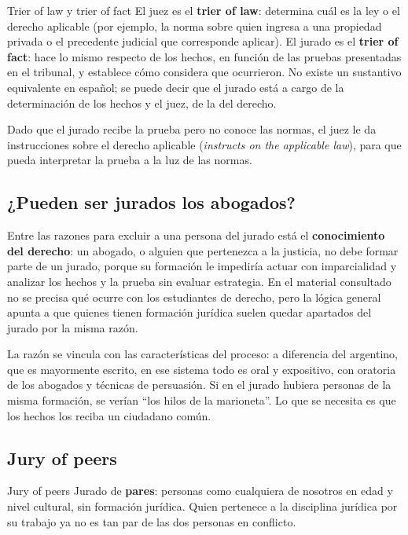 \documentclass[12pt,oneside]{book}
\begin{document}
\begin{definition}{Trier of law y trier of fact}
El juez es el \textbf{trier of law}: determina cuál es la ley o el derecho aplicable (por ejemplo, la norma sobre quien ingresa a una propiedad privada o el precedente judicial que corresponde aplicar). El jurado es el \textbf{trier of fact}: hace lo mismo respecto de los hechos, en función de las pruebas presentadas en el tribunal, y establece cómo considera que ocurrieron. No existe un sustantivo equivalente en español; se puede decir que el jurado está a cargo de la determinación de los hechos y el juez, de la del derecho.
\end{definition}

Dado que el jurado recibe la prueba pero no conoce las normas, el juez le da instrucciones sobre el derecho aplicable (\textit{instructs on the applicable law}), para que pueda interpretar la prueba a la luz de las normas.

\subsection{¿Pueden ser jurados los abogados?}

Entre las razones para excluir a una persona del jurado está el \textbf{conocimiento del derecho}: un abogado, o alguien que pertenezca a la justicia, no debe formar parte de un jurado, porque su formación le impediría actuar con imparcialidad y analizar los hechos y la prueba sin evaluar estrategia. En el material consultado no se precisa qué ocurre con los estudiantes de derecho, pero la lógica general apunta a que quienes tienen formación jurídica suelen quedar apartados del jurado por la misma razón.

La razón se vincula con las características del proceso: a diferencia del argentino, que es mayormente escrito, en ese sistema todo es oral y expositivo, con oratoria de los abogados y técnicas de persuasión. Si en el jurado hubiera personas de la misma formación, se verían ``los hilos de la marioneta''. Lo que se necesita es que los hechos los reciba un ciudadano común.

\subsection{Jury of peers}

\begin{definition}{Jury of peers}
Jurado de \textbf{pares}: personas como cualquiera de nosotros en edad y nivel cultural, sin formación jurídica. Quien pertenece a la disciplina jurídica por su trabajo ya no es tan par de las dos personas en conflicto.
\end{definition}
\end{document}
